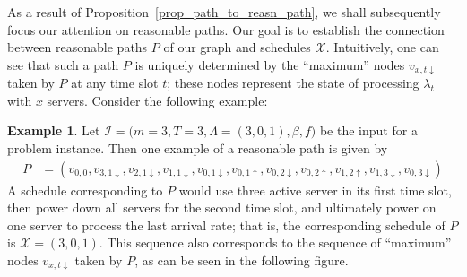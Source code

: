 \documentclass[hidelinks]{article}
\theoremstyle{plain}
\theoremstyle{definition}
\newtheorem{exmpl}[thm]{Example}
\theoremstyle{rem}
\newcommand{\mx}{\mathcal{X}}
\newcommand{\inp}{\mathcal{I}}
\begin{document}
As a result of Proposition~\ref{prop_path_to_reasn_path}, we shall subsequently focus our attention on reasonable paths. Our goal is to establish the connection between reasonable paths $P$ of our graph and schedules $\mx$. Intuitively, one can see that such a path $P$ is uniquely determined by the ``maximum'' nodes $v_{x,t\downarrow}$ taken by $P$ at any time slot $t$; these nodes represent the state of processing $\lambda_t$ with $x$ servers. Consider the following example:
\begin{exmpl}
Let $\inp=\bigl(m=3,T=3,\Lambda=(3,0,1),\beta,f\bigr)$ be the input for a problem instance. Then one example of a reasonable path is given by
\begin{align*}
	P&=(v_{0,0},v_{3,1\downarrow},v_{2,1\downarrow},v_{1,1\downarrow},v_{0,1\downarrow},v_{0,1\uparrow},v_{0,2\downarrow},v_{0,2\uparrow},v_{1,2\uparrow},v_{1,3\downarrow},v_{0,3\downarrow})
\end{align*}
A schedule corresponding to $P$ would use three active server in its first time slot, then power down all servers for the second time slot, and ultimately power on one server to process the last arrival rate; that is, the corresponding schedule of $P$ is $\mx=(3,0,1)$. This sequence also corresponds to the sequence of ``maximum'' nodes $v_{x,t\downarrow}$ taken by $P$, as can be seen in the following figure.
\begin{figure}[H]
\centering
{}
\end{figure}
\end{exmpl}
\end{document}
